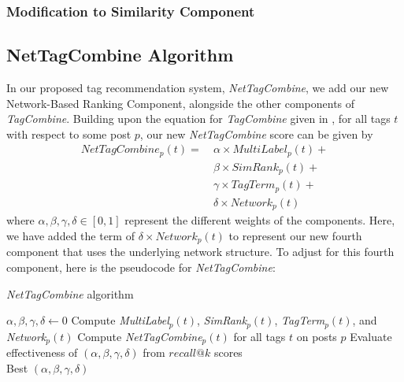 \documentclass[11pt]{IEEEtran}
\begin{document}
\subsubsection{Modification to Similarity Component}

\subsection{NetTagCombine Algorithm}

In our proposed tag recommendation system, \textit{NetTagCombine}, we add our new Network-Based Ranking Component, alongside the other components of \textit{TagCombine}. Building upon the equation for \textit{TagCombine} given in \cite{1}, for all tags $t$ with respect to some post $p$, our new \textit{NetTagCombine} score can be given by
\begin{align*}
NetTagCombine_p(t) =\ &\alpha \times MultiLabel_p(t) +\\
&\beta \times SimRank_p(t) +\\
&\gamma \times TagTerm_p(t) +\\
&\delta \times Network_p(t)
\end{align*}
where $\alpha,\beta,\gamma,\delta \in [0,1]$ represent the different weights of the components. Here, we have added the term of $\delta \times Network_p(t)$ to represent our new fourth component that uses the underlying network structure. To adjust for this fourth component, here is the pseudocode for \textit{NetTagCombine}:


\begin{algorithm*}
  \caption{\textit{NetTagCombine} algorithm}\label{ntc}
  \begin{algorithmic}[1]
    \State $\alpha, \beta, \gamma, \delta \gets 0$
        \State Compute \textit{MultiLabel}$_p(t)$, \textit{SimRank}$_p(t)$, \textit{TagTerm}$_p(t)$, and \textit{Network$_p(t)$}
      \EndFor
    \EndFor
            \State Compute \textit{NetTagCombine}$_p(t)$ for all tags $t$ on posts $p$
            \State Evaluate effectiveness of $(\alpha,\beta,\gamma,\delta)$ from $recall@k$ scores
          \EndFor
        \EndFor
      \EndFor
    \EndFor\\
    \Return Best $(\alpha,\beta,\gamma,\delta)$\;
  \end{algorithmic}
\end{algorithm*}
\end{document}
